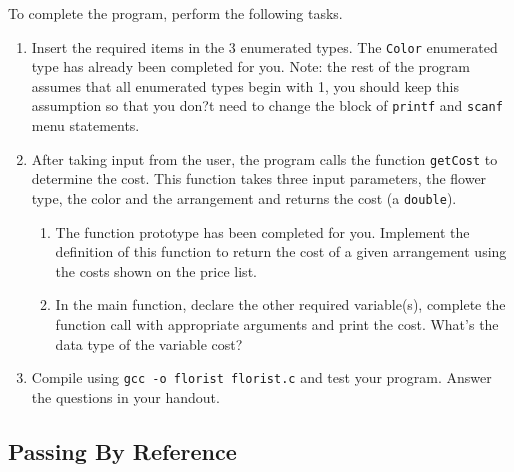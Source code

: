 \documentclass[12pt]{scrartcl}
\begin{document}
To complete the program, perform the following tasks.
\begin{enumerate}
  \item Insert the required items in the 3 enumerated types.  The \texttt{Color} 
  	enumerated type has already been completed for you.  Note: the rest of the 
	program assumes that all enumerated types begin with 1, you should keep 
	this assumption so that you don?t need to change the block of \texttt{printf}
	and \texttt{scanf} menu statements.
  \item After taking input from the user, the program calls the function 
	\texttt{getCost} to determine the cost. This function takes three 
	input parameters, the flower type, the color and the arrangement and 
	returns the cost (a \texttt{double}).
	\begin{enumerate}
	  \item The function prototype has been completed for you. Implement the 
	  definition of this function to return the cost of a given arrangement using 
	  the costs shown on the price list.
	  \item In the main function, declare the other required variable(s), complete 
	  the function call with appropriate arguments and print the cost. What's the 
	  data type of the variable cost?
	\end{enumerate}
  \item Compile using  \texttt{gcc -o florist florist.c} and test your program.  
	Answer the questions in your handout.
\end{enumerate}

\subsection{Passing By Reference}
\end{document}
